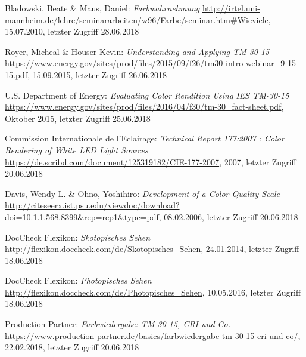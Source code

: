 \begin{thebibliography}{}


Bladowski, Beate \& Maus, Daniel:
\emph{\glqq Farbwahrnehmung\grqq}
\url{http://irtel.uni-mannheim.de/lehre/seminararbeiten/w96/Farbe/seminar.htm#Wieviele}, 15.07.2010, letzter Zugriff 28.06.2018

Royer, Micheal \& Houser Kevin:
\emph{\glqq Understanding and Applying TM-30-15\grqq}
\url{https://www.energy.gov/sites/prod/files/2015/09/f26/tm30-intro-webinar_9-15-15.pdf}, 15.09.2015, letzter Zugriff 26.06.2018

U.S. Department of Energy:
\emph{\glqq Evaluating Color Rendition Using IES TM-30-15\grqq}
\url{https://www.energy.gov/sites/prod/files/2016/04/f30/tm-30_fact-sheet.pdf}, Oktober 2015, letzter Zugriff 25.06.2018

Commission Internationale de l'Eclairage:
\emph{\glqq Technical Report 177:2007 : Color Rendering of White LED Light Sources\grqq}
\url{https://de.scribd.com/document/125319182/CIE-177-2007}, 2007, letzter Zugriff 20.06.2018

Davis, Wendy L. \& Ohno, Yoshihiro:
\emph{\glqq Development of a Color Quality Scale\grqq}
\url{http://citeseerx.ist.psu.edu/viewdoc/download?doi=10.1.1.568.8399&rep=rep1&type=pdf}, 08.02.2006, letzter Zugriff 20.06.2018

DocCheck Flexikon:
\emph{\glqq Skotopisches Sehen\grqq}
\url{http://flexikon.doccheck.com/de/Skotopisches_Sehen}, 24.01.2014, letzter Zugriff 18.06.2018

DocCheck Flexikon:
\emph{\glqq Photopisches Sehen\grqq}
\url{http://flexikon.doccheck.com/de/Photopisches_Sehen}, 10.05.2016, letzter Zugriff 18.06.2018

Production Partner:
\emph{\glqq Farbwiedergabe: TM-30-15, CRI und Co.\grqq}
\url{https://www.production-partner.de/basics/farbwiedergabe-tm-30-15-cri-und-co/}, 22.02.2018, letzter Zugriff 20.06.2018



\end{thebibliography}
